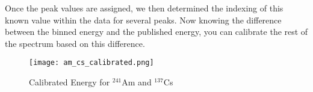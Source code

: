 Once the peak values are assigned, we then determined the indexing of this known value within the data for several peaks.
Now knowing the difference between the binned energy and the published energy, you can calibrate the rest of the spectrum based
on this difference.

\begin{figure}
  \centering
  \texttt{[image: am\_cs\_calibrated.png]}
  \caption{Calibrated Energy for $^{241}$Am and $^{137}$Cs}
\end{figure}
